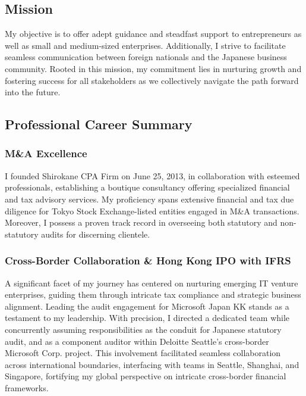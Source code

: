 \subsection{Mission}

My objective is to offer adept guidance and steadfast support to entrepreneurs as well as small and medium-sized enterprises. Additionally, I strive to facilitate seamless communication between foreign nationals and the Japanese business community. Rooted in this mission, my commitment lies in nurturing growth and fostering success for all stakeholders as we collectively navigate the path forward into the future.

\subsection{Professional Career Summary}

\subsubsection{M\&A Excellence}

I founded Shirokane CPA Firm on June 25, 2013, in collaboration with esteemed professionals, establishing a boutique consultancy offering specialized financial and tax advisory services. My proficiency spans extensive financial and tax due diligence for Tokyo Stock Exchange-listed entities engaged in M\&A transactions. Moreover, I possess a proven track record in overseeing both statutory and non-statutory audits for discerning clientele.

\subsubsection{Cross-Border Collaboration \& Hong Kong IPO with IFRS}

A significant facet of my journey has centered on nurturing emerging IT venture enterprises, guiding them through intricate tax compliance and strategic business alignment. Leading the audit engagement for Microsoft Japan KK stands as a testament to my leadership. With precision, I directed a dedicated team while concurrently assuming responsibilities as the conduit for Japanese statutory audit, and as a component auditor within Deloitte Seattle's cross-border Microsoft Corp. project. This involvement facilitated seamless collaboration across international boundaries, interfacing with teams in Seattle, Shanghai, and Singapore, fortifying my global perspective on intricate cross-border financial frameworks.


